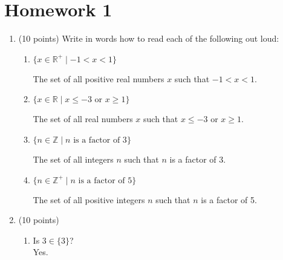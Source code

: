 \documentclass{article}
\begin{document}
\section*{Homework 1}

\begin{enumerate}

    \item (10 points) Write in words how to read each of the following out loud:
    \begin{enumerate}
        \item $\{x \in \mathbb{R}^+ \mid -1 < x < 1\}$
        
        \vspace{1em}
        The set of all positive real numbers \( x \) such that \( -1 < x < 1 \).
        \vspace{1em}
        
        \hrulefill
        
        \item $\{x \in \mathbb{R} \mid x \leq -3 \text{ or } x \geq 1\}$

        \vspace{1em}
        The set of all real numbers \( x \) such that \( x \leq -3 \) or \( x \geq 1 \).
        \vspace{1em}
        
        \hrulefill

        \item $\{n \in \mathbb{Z} \mid n \text{ is a factor of 3}\}$

        \vspace{1em}
        The set of all integers \( n \) such that \( n \) is a factor of 3.
        \vspace{1em}
        
        \hrulefill

        \item $\{n \in \mathbb{Z}^+ \mid n \text{ is a factor of 5}\}$

        \vspace{1em}
        The set of all positive integers \( n \) such that \( n \) is a factor of 5.
        \vspace{1em}
    \end{enumerate}
    
    \hrulefill

    \item (10 points)
    \begin{enumerate}
        \item Is $3 \in \{3\}$?\\
        \vspace{1em}
        Yes.
        \vspace{1em}
        

\end{enumerate}
\end{enumerate}
\end{document}
